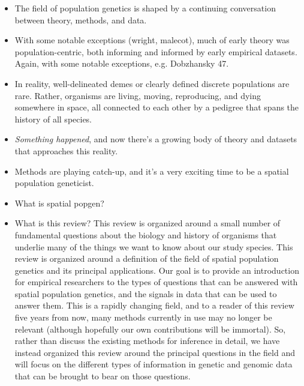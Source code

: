 \documentclass{ar-1col}
\begin{document}
\begin{itemize}
\item The field of population genetics is shaped by a continuing conversation
between theory, methods, and data.
\item With some notable exceptions (wright, malecot),
much of early theory was population-centric,
both informing and informed by early empirical datasets.
    \subitem Again, with some notable exceptions, e.g. Dobzhansky 47.
\item In reality, well-delineated demes or clearly defined discrete populations are rare.
Rather, organisms are living, moving, reproducing, and dying somewhere in space,
all connected to each other by a pedigree that spans the history of all species.
\item \emph{Something happened},
and now there's a growing body of theory and datasets
that approaches this reality.
\item Methods are playing catch-up,
and it's a very exciting time to be a spatial population geneticist.
\item What is spatial popgen?
\item What is this review?
\subitem This review is organized around a small number of
fundamental questions about the biology and history of organisms
that underlie many of the things we want to know about our study species.
This review is organized around a definition of the field of spatial population genetics
and its principal applications.
Our goal is to provide an introduction for empirical researchers
to the types of questions that can be answered
with spatial population genetics,
and the signals in data that can be used to answer them.
This is a rapidly changing field,
and to a reader of this review five years from now,
many methods currently in use may no longer be relevant
(although hopefully our own contributions will be immortal).
So, rather than discuss the existing methods for inference in detail,
we have instead organized this review around the principal questions in the field
and will focus on the different types of information in genetic and genomic data
that can be brought to bear on those questions.
\end{itemize}
\end{document}
